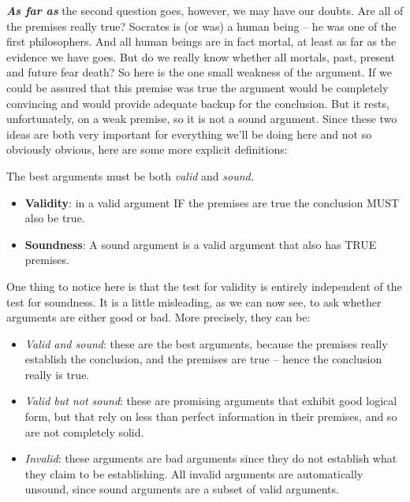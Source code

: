 \documentclass[12pt, openany]{book}
\makeatletter
\newenvironment{kframe}{%
\medskip{}
\setlength{\fboxsep}{.8em}
 \def\at@end@of@kframe{}%
 \ifinner\ifhmode%
  \def\at@end@of@kframe{\end{minipage}}%
  \begin{minipage}{\columnwidth}%
 \fi\fi%
 \def\FrameCommand##1{\hskip\@totalleftmargin \hskip-\fboxsep
 \colorbox{shadecolor}{##1}\hskip-\fboxsep
     \hskip-\linewidth \hskip-\@totalleftmargin \hskip\columnwidth}%
 \MakeFramed {\advance\hsize-\width
   \@totalleftmargin\z@ \linewidth\hsize
   \@setminipage}}%
 {\par\unskip\endMakeFramed%
 \at@end@of@kframe}
\newenvironment{rmdblock}[1]
  {
  \begin{itemize}
  \renewcommand{\labelitemi}{
    \raisebox{-.7\height}[0pt][0pt]{
      {\setkeys{Gin}{width=3em,keepaspectratio}\texttt{[image: img/\#1]}}
    }
  }
  \setlength{\fboxsep}{1em}
  \begin{kframe}
  \item
  }
  {
  \end{kframe}
  \end{itemize}
  }
\newenvironment{caution}
  {\begin{rmdblock}{caution}}
  {\end{rmdblock}}
\makeatother
\begin{document}
\textbf{\emph{As far as}} the second question goes, however, we may have our doubts. Are all of the premises really true? Socrates is (or was) a human being -- he was one of the first philosophers. And all human beings are in fact mortal, at least as far as the evidence we have goes. But do we really know whether all mortals, past, present and future fear death? So here is the one small weakness of the argument. If we could be assured that this premise was true the argument would be completely convincing and would provide adequate backup for the conclusion. But it rests, unfortunately, on a weak premise, so it is not a sound argument. Since these two ideas are both very important for everything we'll be doing here and not so obviously obvious, here are some more explicit definitions:

\begin{caution}

The best arguments must be both \emph{valid} and \emph{sound.}

\begin{itemize}
\item
  \textbf{Validity}: in a valid argument IF the premises are true the conclusion MUST also be true.
\item
  \textbf{Soundness}: A sound argument is a valid argument that also has TRUE premises.
\end{itemize}

\end{caution}

One thing to notice here is that the test for validity is entirely independent of the test for soundness. It is a little misleading, as we can now see, to ask whether arguments are either good or bad. More precisely, they can be:

\begin{itemize}
\item
  \emph{Valid and sound}: these are the best arguments, because the premises really establish the conclusion, and the premises are true -- hence the conclusion really is true.
\item
  \emph{Valid but not sound}: these are promising arguments that exhibit good logical form, but that rely on less than perfect information in their premises, and so are not completely solid.
\item
  \emph{Invalid}: these arguments are bad arguments since they do not establish what they claim to be establishing. All invalid arguments are automatically unsound, since sound arguments are a subset of valid arguments.
\end{itemize}
\end{document}
